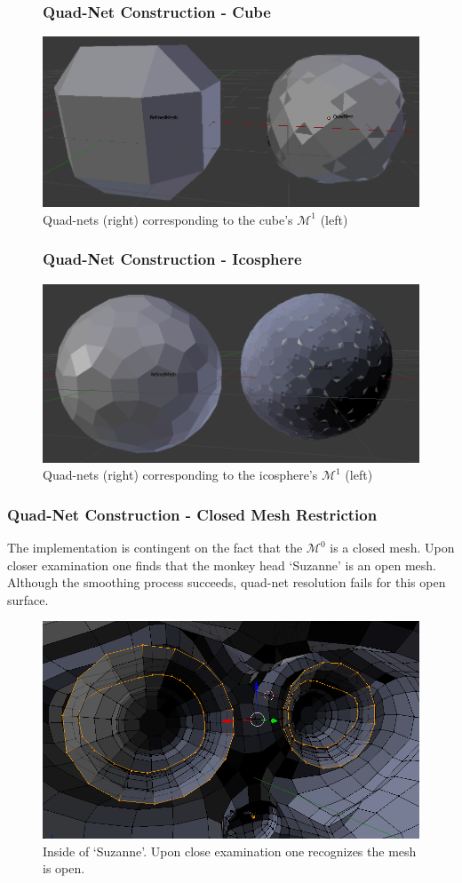 \documentclass[11pt]{beamer}
\begin{document}
	\begin{frame}
		\begin{figure}[bp!]
			\frametitle{Quad-Net Construction - Cube}
			\centering
			\includegraphics[width=.8\linewidth]{img/quad_cube}
			\caption{Quad-nets (right) corresponding to the cube's $\mathcal{M}^1$ (left)}	
		\end{figure}
	\end{frame}	

	\begin{frame}
		\begin{figure}[h]
			\frametitle{Quad-Net Construction - Icosphere}
			\centering
			\includegraphics[width=.8\linewidth]{img/quad_icosphere}
			\caption{Quad-nets (right) corresponding to the icosphere's $\mathcal{M}^1$ (left)}	
		\end{figure}
	\end{frame}

	\begin{frame}
		\frametitle{Quad-Net Construction - Closed Mesh Restriction}
		The implementation is contingent on the fact that the $\mathcal{M}^0$ is a closed mesh. Upon closer examination one finds that the monkey head `Suzanne' is an open mesh. Although the smoothing process succeeds, quad-net resolution fails for this open surface. \\
		\begin{figure}[h]
			\centering
			\includegraphics[width=.5\linewidth]{img/quad_monkey}
			\caption{Inside of `Suzanne'. Upon close examination one recognizes the mesh is open.}	
		\end{figure}
	\end{frame}
	
\end{document}
